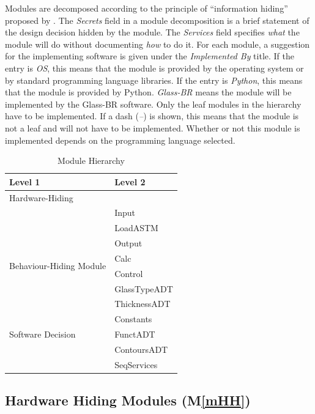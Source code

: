 \documentclass[12pt]{article}
\newcommand{\mref}[1]{M\ref{#1}}
\begin{document}
Modules are decomposed according to the principle of ``information hiding''
proposed by \citet{ParnasEtAl1984}. The \emph{Secrets} field in a module
decomposition is a brief statement of the design decision hidden by the
module. The \emph{Services} field specifies \emph{what} the module will do
without documenting \emph{how} to do it. For each module, a suggestion for the
implementing software is given under the \emph{Implemented By} title. If the
entry is \emph{OS}, this means that the module is provided by the operating
system or by standard programming language libraries. If the entry is
\emph{Python}, this means that the module is provided by Python.  
\emph{Glass-BR} means the module will be implemented by the Glass-BR software.  
Only the leaf modules in the
hierarchy have to be implemented. If a dash (\emph{--}) is shown, this means
that the module is not a leaf and will not have to be implemented. Whether or
not this module is implemented depends on the programming language
selected.

\begin{table}[h!]
\centering
\begin{tabular}{p{} p{}}
\toprule
\textbf{Level 1} & \textbf{Level 2}\\
\midrule

{Hardware-Hiding} & ~ \\
\midrule

\multirow{8}{0.3\textwidth}{Behaviour-Hiding Module} 
& Input\\
& LoadASTM\\
& Output\\
& Calc\\
& Control\\
& GlassTypeADT\\
& ThicknessADT\\
& Constants\\

\midrule

\multirow{1}{0.3\textwidth}{Software Decision}
& FunctADT\\
& ContoursADT\\
& SeqServices\\

\bottomrule

\end{tabular}
\caption{Module Hierarchy}
\label{TblMH}
\end{table}

\subsection{Hardware Hiding Modules (\mref{mHH})}
\end{document}
